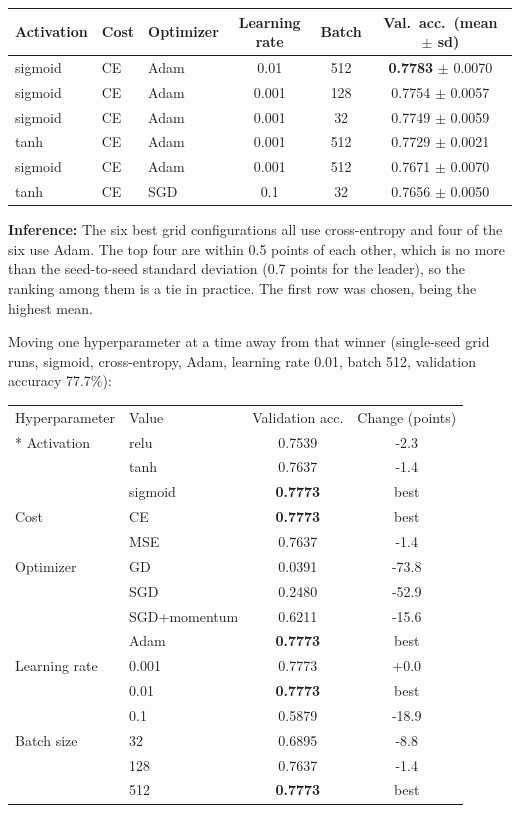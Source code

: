 \documentclass[12pt,a4paper]{article}
\begin{document}
\begin{longtable}{lllccc}
\toprule
Activation & Cost & Optimizer & Learning rate & Batch & Val.\ acc.\ (mean $\pm$ sd) \\
\midrule
sigmoid & CE & Adam & 0.01 & 512 & \textbf{0.7783} $\pm$ 0.0070 \\
sigmoid & CE & Adam & 0.001 & 128 & 0.7754 $\pm$ 0.0057 \\
sigmoid & CE & Adam & 0.001 & 32 & 0.7749 $\pm$ 0.0059 \\
tanh & CE & Adam & 0.001 & 512 & 0.7729 $\pm$ 0.0021 \\
sigmoid & CE & Adam & 0.001 & 512 & 0.7671 $\pm$ 0.0070 \\
tanh & CE & SGD & 0.1 & 32 & 0.7656 $\pm$ 0.0050 \\
\bottomrule
\end{longtable}

\textbf{Inference:} The six best grid configurations all use cross-entropy and four of the six use
Adam. The top four are within 0.5 points of each
other, which is no more than the seed-to-seed standard deviation
(0.7 points for the leader), so the ranking among them is a tie in
practice. The first row was chosen, being the highest mean.

\medskip
Moving one hyperparameter at a time away from that winner (single-seed grid runs, sigmoid,
cross-entropy, Adam, learning rate 0.01, batch 512, validation accuracy
77.7\%):

{\small\setlength{\tabcolsep}{4pt}
\begin{longtable}{llcc}
\toprule
Hyperparameter & Value & Validation acc. & Change (points) \\*
\midrule
Activation & relu & 0.7539 & -2.3 \\
 & tanh & 0.7637 & -1.4 \\
 & sigmoid & \textbf{0.7773} & best \\
Cost & CE & \textbf{0.7773} & best \\
 & MSE & 0.7637 & -1.4 \\
Optimizer & GD & 0.0391 & -73.8 \\
 & SGD & 0.2480 & -52.9 \\
 & SGD+momentum & 0.6211 & -15.6 \\
 & Adam & \textbf{0.7773} & best \\
Learning rate & 0.001 & 0.7773 & +0.0 \\
 & 0.01 & \textbf{0.7773} & best \\
 & 0.1 & 0.5879 & -18.9 \\
Batch size & 32 & 0.6895 & -8.8 \\
 & 128 & 0.7637 & -1.4 \\
 & 512 & \textbf{0.7773} & best \\
\bottomrule
\end{longtable}
}
\end{document}
